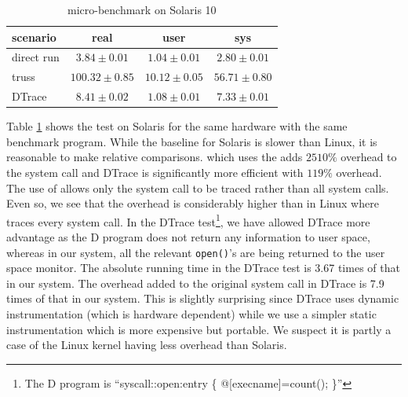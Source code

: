 \begin{table}[ht]
\centering
\begin{tabular}{|l||c|c|c|}
\hline
scenario & real & user & sys \\
\hline
direct run & \begin{math} 3.84\pm0.01 \end{math} & \begin{math} 1.04\pm0.01 \end{math} & \begin{math} 2.80\pm0.01 \end{math} \\
truss & \begin{math} 100.32\pm0.85 \end{math} & \begin{math} 10.12\pm0.05 \end{math} & \begin{math} 56.71\pm0.80 \end{math} \\
DTrace & \begin{math} 8.41\pm0.02 \end{math} & \begin{math} 1.08\pm0.01 \end{math} & \begin{math} 7.33\pm0.01 \end{math} \\
\hline
\end{tabular}
\caption{ micro-benchmark on Solaris 10}
\label{tab:lbox-sol}
\end{table}

Table \ref{tab:lbox-sol} shows the
test on Solaris for the same hardware with the same benchmark program. 
While the baseline for Solaris is slower than Linux, it is reasonable
to make relative comparisons.
 which uses the  adds $2510\%$ overhead 
to the  system call and DTrace is significantly more efficient
with $119\%$ overhead.
The use of  allows only the  system call to
be traced rather than all system calls. Even so, we see that the overhead
is considerably higher than in Linux where  traces every
system call.
In the DTrace test\footnote{
The D program is ``syscall::open:entry \{ @[execname]=count(); \}''},
we have allowed DTrace more advantage 
as the D program does not return any information to user space, 
whereas in our system, all
the relevant {\tt open()}'s are being
returned to the user space monitor.
The absolute running time in the DTrace test is 3.67 times 
of that in our system.
The overhead added to the original system call in DTrace is 7.9 times of
that in our system.
This is slightly surprising since DTrace uses dynamic instrumentation
(which is hardware dependent) while we use a simpler static instrumentation
which is more expensive but portable.
We suspect it is partly a case of the Linux kernel having less overhead
than Solaris.

